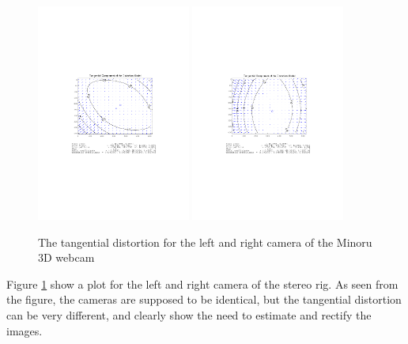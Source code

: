 \begin{figure}[htbp]
    \centering
    \includegraphics[width=0.45\textwidth]{pics/left_tang_dist}
    \includegraphics[width=0.45\textwidth]{pics/right_tang_dist}
    \caption{The tangential distortion for the left and right camera of the Minoru 3D
    webcam}
    \label{chap2:fig-tang-dist}
\end{figure}
Figure \ref{chap2:fig-tang-dist} show a plot for the left and right camera of the stereo
rig. As seen from the figure, the cameras are supposed to be identical, but the tangential
distortion can be very different, and clearly show the need to estimate and rectify the
images. 


